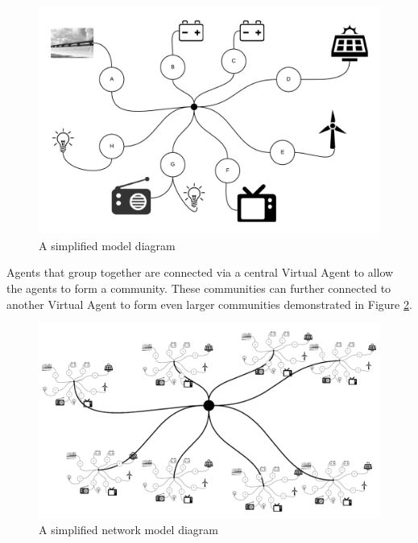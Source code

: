 \clearpage
\begin{figure}[h!]
	\centering
	\includegraphics[scale=0.8]{Images/Model.png}
	\caption{A simplified model diagram}
	\label{fig:SimpleModel}
\end{figure}

Agents that group together are connected via a central Virtual Agent to allow the agents to form a community. These communities can further connected to another Virtual Agent to form even larger communities demonstrated in Figure \ref{fig:SimpleModel2}. 

\begin{figure}[h!]
	\centering
	\includegraphics[scale = 0.9]{Images/Model2.png}
	\caption{A simplified network model diagram}
	\label{fig:SimpleModel2}
\end{figure}

